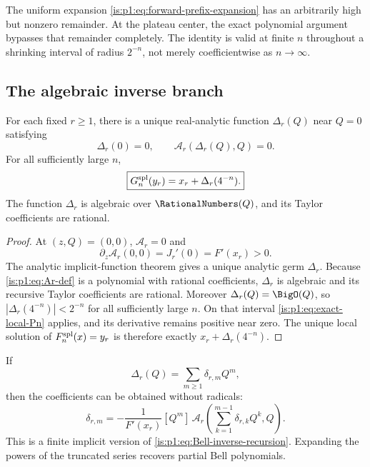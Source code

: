 \begin{remark}
The uniform expansion \eqref{is:p1:eq:forward-prefix-expansion} has an arbitrarily high but
nonzero remainder.  At the plateau center, the exact polynomial argument bypasses that
remainder completely.  The identity is valid at finite $n$ throughout a shrinking interval
of radius $2^{-n}$, not merely coefficientwise as $n\to\infty$.
\end{remark}

\subsection{The algebraic inverse branch}

\begin{theorem}
\label{is:p1:thm:algebraic-germ}
For each fixed $r\ge1$, there is a unique real-analytic function $\Delta_r(Q)$ near
$Q=0$ satisfying
\begin{equation}
 \Delta_r(0)=0,
 \qquad
 \mathcal A_r(\Delta_r(Q),Q)=0.
 \label{is:p1:eq:Delta-implicit}
\end{equation}
For all sufficiently large $n$,
\begin{equation}
 \boxed{
 G_{n}^{\mathrm{spl}}(y_r)=x_r+\Delta_r(4^{-n}).}
 \label{is:p1:eq:exact-quantile-germ}
\end{equation}
The function $\Delta_r$ is algebraic over $\RationalNumbers(Q)$, and its Taylor coefficients are
rational.
\end{theorem}

\begin{proof}
At $(z,Q)=(0,0)$, $\mathcal A_r=0$ and
\[
 \partial_z\mathcal A_r(0,0)=J_r'(0)=F'(x_r)>0.
\]
The analytic implicit-function theorem gives a unique analytic germ $\Delta_r$.
Because \eqref{is:p1:eq:Ar-def} is a polynomial with rational coefficients,
$\Delta_r$ is algebraic and its recursive Taylor coefficients are rational.
Moreover $\Delta_r(Q)=\BigO(Q)$, so
$|\Delta_r(4^{-n})|<2^{-n}$ for all sufficiently large $n$.  On that interval
\eqref{is:p1:eq:exact-local-Pn} applies, and its derivative remains positive near zero.
The unique local solution of $F_{n}^{\mathrm{spl}}(x)=y_r$ is therefore exactly
$x_r+\Delta_r(4^{-n})$.
\end{proof}

If
\begin{equation}
 \Delta_r(Q)=\sum_{m\ge1}\delta_{r,m}Q^m,
 \label{is:p1:eq:Delta-series}
\end{equation}
then the coefficients can be obtained without radicals:
\begin{equation}
 \boxed{
 \delta_{r,m}=-\frac1{F'(x_r)}[Q^m]\,
 \mathcal A_r\!\left(\sum_{k=1}^{m-1}\delta_{r,k}Q^k,Q\right).}
 \label{is:p1:eq:Delta-recursion}
\end{equation}
This is a finite implicit version of \eqref{is:p1:eq:Bell-inverse-recursion}.  Expanding the
powers of the truncated series recovers partial Bell polynomials.

